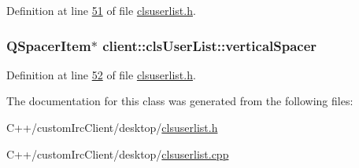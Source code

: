 Definition at line \hyperlink{clsuserlist_8h_source_l00051}{51} of file \hyperlink{clsuserlist_8h_source}{clsuserlist.\-h}.

\hypertarget{classclient_1_1cls_user_list_ab8a319c630d91c47a8b0bcbad56ab9f0}{
\subsubsection[{vertical\-Spacer}]{\setlength{\rightskip}{0pt plus 5cm}Q\-Spacer\-Item$\ast$ client\-::cls\-User\-List\-::vertical\-Spacer\hspace{0.3cm}{\ttfamily [private]}}}\label{de/dda/classclient_1_1cls_user_list_ab8a319c630d91c47a8b0bcbad56ab9f0}


Definition at line \hyperlink{clsuserlist_8h_source_l00052}{52} of file \hyperlink{clsuserlist_8h_source}{clsuserlist.\-h}.



The documentation for this class was generated from the following files\-:\begin{DoxyCompactItemize}
\item 
C++/custom\-Irc\-Client/desktop/\hyperlink{clsuserlist_8h}{clsuserlist.\-h}\item 
C++/custom\-Irc\-Client/desktop/\hyperlink{clsuserlist_8cpp}{clsuserlist.\-cpp}\end{DoxyCompactItemize}
